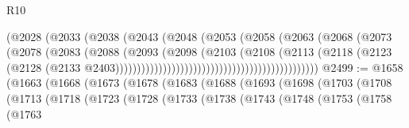 \begin{lexlean}{R10}
\begin{coremodule}
{{{{{{{{{{{{{{{{{{{{{{{{{{{{{{{{{{{{{{{{{{{{{{{{{{{{{{{{{{{{{{{{{{{{{{{{{{{{{{{{{{{{{{{{{{{{{{{{{{{{{{{{{{{{                                                      (@2028
                                                        (@2033
                                                          (@2038
                                                            (@2043
                                                              (@2048
                                                                (@2053
                                                                  (@2058
                                                                    (@2063
                                                                      (@2068
                                                                        (@2073
                                                                          (@2078
                                                                            (@2083
                                                                              (@2088
                                                                                (@2093
                                                                                  (@2098
                                                                                    (@2103
                                                                                      (@2108
                                                                                        (@2113
                                                                                          (@2118
                                                                                            (@2123
                                                                                              (@2128
                                                                                                (@2133
                                                                                                  @2403)))))))))))))))))))))))))))))))))))))))))))))))
@2499 := @1658
    (@1663
      (@1668
        (@1673
          (@1678
            (@1683
              (@1688
                (@1693
                  (@1698
                    (@1703
                      (@1708
                        (@1713
                          (@1718
                            (@1723
                              (@1728
                                (@1733
                                  (@1738
                                    (@1743
                                      (@1748
                                        (@1753
                                          (@1758
                                            (@1763
}}}}}}}}}}}}}}}}}}}}}}}}}}}}}}}}}}}}}}}}}}}}}}}}}}}}}}}}}}}}}}}}}}}}}}}}}}}}}}}}}}}}}}}}}}}}}}}}}}}}}}}}}}}}
\end{coremodule}
\end{lexlean}
